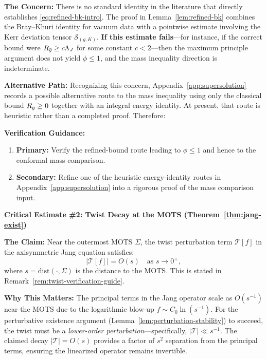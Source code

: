 \textbf{The Concern:} There is no standard identity in the literature that directly establishes \eqref{eq:refined-bk-intro}. The proof in Lemma~\ref{lem:refined-bk} combines the Bray--Khuri identity for vacuum data with a pointwise estimate involving the Kerr deviation tensor $\mathcal{S}_{(g,K)}$. \textbf{If this estimate fails}---for instance, if the correct bound were $R_{\bar{g}} \geq c\Lambda_J$ for some constant $c < 2$---then the maximum principle argument does not yield $\phi \leq 1$, and the mass inequality direction is indeterminate.

\textbf{Alternative Path:} Recognizing this concern, Appendix~\ref{app:supersolution} records a possible alternative route to the mass inequality using only the classical bound $R_{\bar{g}} \geq 0$ together with an integral energy identity. At present, that route is heuristic rather than a completed proof. Therefore:
\begin{center}
\end{center}

\textbf{Verification Guidance:}
\begin{enumerate}[label=(\roman*)]
\item \textbf{Primary:} Verify the refined-bound route leading to $\phi \leq 1$ and hence to the conformal mass comparison.
\item \textbf{Secondary:} Refine one of the heuristic energy-identity routes in Appendix~\ref{app:supersolution} into a rigorous proof of the mass comparison input.
\end{enumerate}
\textbf{Critical Estimate \#2: Twist Decay at the MOTS (Theorem~\ref{thm:jang-exist})}

\textbf{The Claim:} Near the outermost MOTS $\Sigma$, the twist perturbation term $\mathcal{T}[f]$ in the axisymmetric Jang equation satisfies:
\[
|\mathcal{T}[f]| = O(s) \quad \text{as } s \to 0^+,
\]
where $s = \mathrm{dist}(\cdot, \Sigma)$ is the distance to the MOTS. This is stated in Remark~\ref{rem:twist-verification-guide}.

\textbf{Why This Matters:} The principal terms in the Jang operator scale as $O(s^{-1})$ near the MOTS due to the logarithmic blow-up $f \sim C_0 \ln(s^{-1})$. For the perturbative existence argument (Lemma~\ref{lem:perturbation-stability}) to succeed, the twist must be a \emph{lower-order perturbation}---specifically, $|\mathcal{T}| \ll s^{-1}$. The claimed decay $|\mathcal{T}| = O(s)$ provides a factor of $s^2$ separation from the principal terms, ensuring the linearized operator remains invertible.

